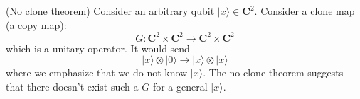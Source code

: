 \vspace{2ex}
\begin{thm}
(No clone theorem) Consider an arbitrary qubit $|x\rangle \in {\bm C}^2$. Consider a clone map (a copy map):
\[G:{\bm C}^2\times {\bm C}^2\rightarrow {\bm C}^2\times {\bm C}^2\]
which is a unitary operator. It would send
\[|x\rangle \otimes |0\rangle \rightarrow |x\rangle \otimes |x\rangle \]
where we emphasize that we do not know $|x\rangle $. The no clone theorem suggests that there doesn't exist such a $G$ for a general $|x\rangle $. 
\end{thm}
\vspace{2ex}
 
